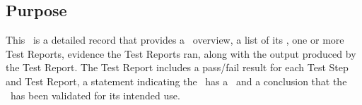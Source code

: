 \subsection{Purpose}
This \stdRptPkg\ is a detailed record that provides a \stdCfgItem\ overview,
a list of its \stdIUR, one or more Test Reports, evidence the Test Reports ran,
along with the output produced by the Test Report. The Test Report includes
a pass/fail result for each Test Step and Test Report, a statement indicating
the \stdCfgItem\ has a \stdCfgID\ and a conclusion that the \stdCfgItem\ has
been validated for its intended use.
